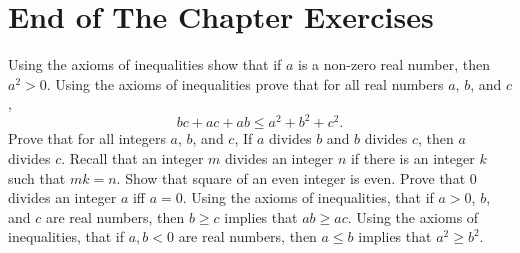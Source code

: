 \section*{End of The Chapter Exercises}
\begin{exercises}
  \exerciseitem Using the axioms of inequalities show that if $a$ is a non-zero
    real number, then $a^2 > 0$.
  \exerciseitem Using the axioms of inequalities prove that for all real
    numbers $a$, $b$, and $c$, $$bc + ac + ab \le a^2 + b^2 + c^2.$$
  \exerciseitem Prove that for all integers $a$, $b$, and $c$,
    If $a$ divides $b$ and $b$ divides $c$, then $a$ divides $c$.
    Recall that an integer $m$ divides an integer $n$ if there is an integer
    $k$ such that $mk = n$.
  \exerciseitem Show that square of an even integer is even.
  \exerciseitem Prove that $0$ divides an integer $a$ iff $a = 0$.
  \exerciseitem Using the axioms of inequalities, that if $a > 0$, $b$, and $c$
    are real numbers, then $b \ge c$ implies that $ab \ge ac$.
  \exerciseitem Using the axioms of inequalities, that if $a, b < 0$ are real
    numbers, then $a \le b$ implies that $a^2 \ge b^2$.
\end{exercises}
